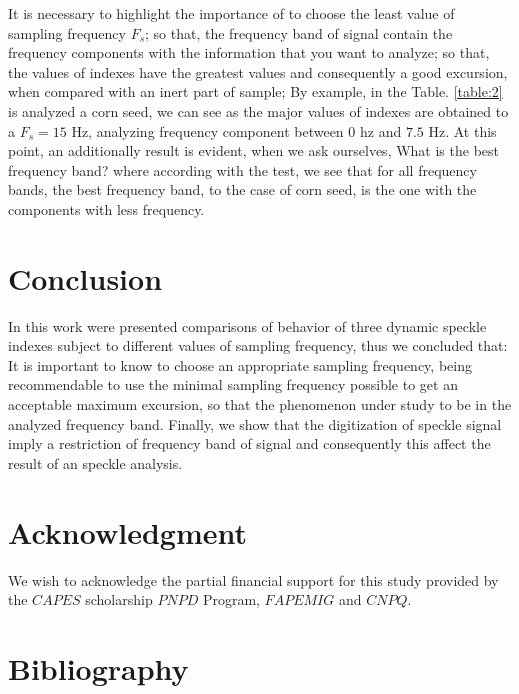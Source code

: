 \documentclass[review]{elsarticle}
\begin{document}
It is necessary to highlight the importance of to choose the least value of sampling frequency $F_s$;
so that, 
the frequency band of signal contain the frequency components with the information that you want to analyze;
so that, the values of indexes have the greatest values and consequently a good excursion, 
when compared with an inert part of sample; 
By example, in the Table. \ref{table:2} is analyzed a corn seed, 
we can see as the major values of indexes are obtained to a $F_s=15$ Hz, 
analyzing frequency component between $0$ hz and $7.5$ Hz. At this point,
an additionally result is evident, when we ask ourselves, 
What is the best frequency band? where according with the test, we see that for
all frequency bands, 
the best frequency band, to the case of corn seed, is the one with the components with less frequency.
 

\section{Conclusion} 

In this work were presented comparisons of behavior of three dynamic speckle indexes
subject to different values of sampling frequency, thus we concluded that:
It is important to know to choose an appropriate sampling frequency, 
being recommendable to use the minimal sampling frequency possible to get an acceptable maximum excursion,
so that the phenomenon under study to be in the analyzed frequency band.
Finally, 
we show that the digitization  of speckle signal imply a restriction of frequency 
band of signal and consequently this affect the result of an speckle analysis.


\section{Acknowledgment}
We wish to acknowledge the partial financial support for this study provided by the $CAPES$ 
scholarship
$PNPD$ Program, $FAPEMIG$ and $CNPQ$.


\section{Bibliography}
\end{document}
